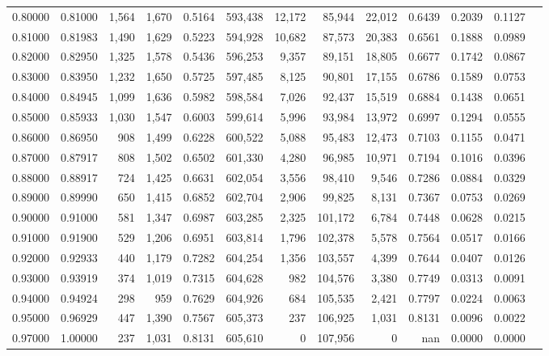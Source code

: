 \begin{tabular}{rrrrrrrrrrrrr}
0.80000 & 0.81000 &  1,564 & 1,670 &                                     0.5164 & 593,438 &  12,172 &  85,944 &  22,012 & 0.6439 & 0.2039 & 0.1127 \\
0.81000 & 0.81983 &  1,490 & 1,629 &                                     0.5223 & 594,928 &  10,682 &  87,573 &  20,383 & 0.6561 & 0.1888 & 0.0989 \\
0.82000 & 0.82950 &  1,325 & 1,578 &                                     0.5436 & 596,253 &   9,357 &  89,151 &  18,805 & 0.6677 & 0.1742 & 0.0867 \\
0.83000 & 0.83950 &  1,232 & 1,650 &                                     0.5725 & 597,485 &   8,125 &  90,801 &  17,155 & 0.6786 & 0.1589 & 0.0753 \\
0.84000 & 0.84945 &  1,099 & 1,636 &                                     0.5982 & 598,584 &   7,026 &  92,437 &  15,519 & 0.6884 & 0.1438 & 0.0651 \\
0.85000 & 0.85933 &  1,030 & 1,547 &                                     0.6003 & 599,614 &   5,996 &  93,984 &  13,972 & 0.6997 & 0.1294 & 0.0555 \\
0.86000 & 0.86950 &    908 & 1,499 &                                     0.6228 & 600,522 &   5,088 &  95,483 &  12,473 & 0.7103 & 0.1155 & 0.0471 \\
0.87000 & 0.87917 &    808 & 1,502 &                                     0.6502 & 601,330 &   4,280 &  96,985 &  10,971 & 0.7194 & 0.1016 & 0.0396 \\
0.88000 & 0.88917 &    724 & 1,425 &                                     0.6631 & 602,054 &   3,556 &  98,410 &   9,546 & 0.7286 & 0.0884 & 0.0329 \\
0.89000 & 0.89990 &    650 & 1,415 &                                     0.6852 & 602,704 &   2,906 &  99,825 &   8,131 & 0.7367 & 0.0753 & 0.0269 \\
0.90000 & 0.91000 &    581 & 1,347 &                                     0.6987 & 603,285 &   2,325 & 101,172 &   6,784 & 0.7448 & 0.0628 & 0.0215 \\
0.91000 & 0.91900 &    529 & 1,206 &                                     0.6951 & 603,814 &   1,796 & 102,378 &   5,578 & 0.7564 & 0.0517 & 0.0166 \\
0.92000 & 0.92933 &    440 & 1,179 &                                     0.7282 & 604,254 &   1,356 & 103,557 &   4,399 & 0.7644 & 0.0407 & 0.0126 \\
0.93000 & 0.93919 &    374 & 1,019 &                                     0.7315 & 604,628 &     982 & 104,576 &   3,380 & 0.7749 & 0.0313 & 0.0091 \\
0.94000 & 0.94924 &    298 &   959 &                                     0.7629 & 604,926 &     684 & 105,535 &   2,421 & 0.7797 & 0.0224 & 0.0063 \\
0.95000 & 0.96929 &    447 & 1,390 &                                     0.7567 & 605,373 &     237 & 106,925 &   1,031 & 0.8131 & 0.0096 & 0.0022 \\
0.97000 & 1.00000 &    237 & 1,031 &                                     0.8131 & 605,610 &       0 & 107,956 &       0 &    nan & 0.0000 & 0.0000 \\
\bottomrule
\end{tabular}
